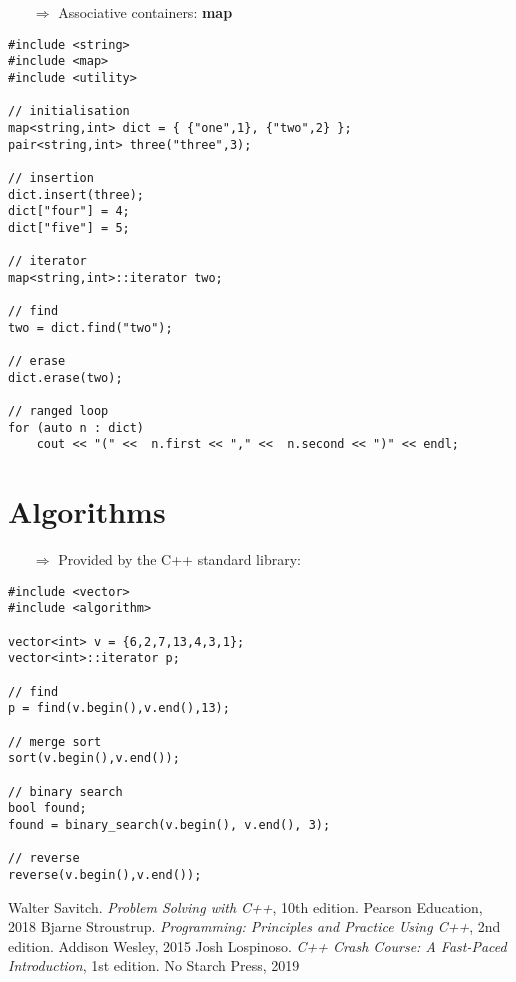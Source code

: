 \documentclass[10pt]{article}
\begin{document}
\begin{enumerate}
\item[$\Rightarrow$] Associative containers: \textbf{map}
\end{enumerate}
\begin{lstlisting}
#include <string>
#include <map>
#include <utility>

// initialisation
map<string,int> dict = { {"one",1}, {"two",2} };
pair<string,int> three("three",3);

// insertion    
dict.insert(three);
dict["four"] = 4;
dict["five"] = 5;

// iterator    
map<string,int>::iterator two;

// find    
two = dict.find("two");

// erase    
dict.erase(two);

// ranged loop
for (auto n : dict)
    cout << "(" <<  n.first << "," <<  n.second << ")" << endl;
\end{lstlisting}
%
%
\section{Algorithms}
\small
\begin{enumerate}
\item[$\Rightarrow$] Provided by the C++ standard library:
\end{enumerate}
\begin{lstlisting}
#include <vector>
#include <algorithm>

vector<int> v = {6,2,7,13,4,3,1};
vector<int>::iterator p;

// find
p = find(v.begin(),v.end(),13);

// merge sort
sort(v.begin(),v.end());

// binary search
bool found;
found = binary_search(v.begin(), v.end(), 3);

// reverse
reverse(v.begin(),v.end());
\end{lstlisting}
%
%
\small
\begin{thebibliography}{99}
 Walter Savitch. \textsl{Problem Solving with C++}, 10th edition. Pearson Education, 2018
 Bjarne Stroustrup. \textsl{Programming: Principles and Practice Using C++}, 2nd edition. Addison Wesley, 2015
 Josh Lospinoso. \textsl{C++ Crash Course: A Fast-Paced Introduction}, 1st edition. No Starch Press, 2019
\end{thebibliography}
%
%
\printindex
\end{document}
